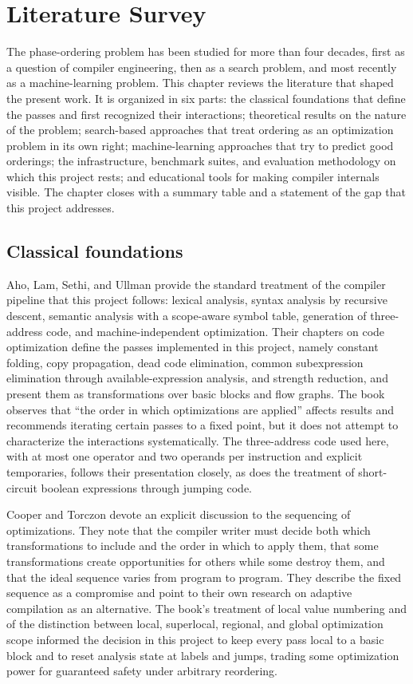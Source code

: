\chapter{Literature Survey}

The phase-ordering problem has been studied for more than four decades, first as a question of compiler engineering, then as a search problem, and most recently as a machine-learning problem. This chapter reviews the literature that shaped the present work. It is organized in six parts: the classical foundations that define the passes and first recognized their interactions; theoretical results on the nature of the problem; search-based approaches that treat ordering as an optimization problem in its own right; machine-learning approaches that try to predict good orderings; the infrastructure, benchmark suites, and evaluation methodology on which this project rests; and educational tools for making compiler internals visible. The chapter closes with a summary table and a statement of the gap that this project addresses.

\section*{Classical foundations}

Aho, Lam, Sethi, and Ullman \cite{aho2006} provide the standard treatment of the compiler pipeline that this project follows: lexical analysis, syntax analysis by recursive descent, semantic analysis with a scope-aware symbol table, generation of three-address code, and machine-independent optimization. Their chapters on code optimization define the passes implemented in this project, namely constant folding, copy propagation, dead code elimination, common subexpression elimination through available-expression analysis, and strength reduction, and present them as transformations over basic blocks and flow graphs. The book observes that ``the order in which optimizations are applied'' affects results and recommends iterating certain passes to a fixed point, but it does not attempt to characterize the interactions systematically. The three-address code used here, with at most one operator and two operands per instruction and explicit temporaries, follows their presentation closely, as does the treatment of short-circuit boolean expressions through jumping code.

Cooper and Torczon \cite{cooper2011} devote an explicit discussion to the sequencing of optimizations. They note that the compiler writer must decide both which transformations to include and the order in which to apply them, that some transformations create opportunities for others while some destroy them, and that the ideal sequence varies from program to program. They describe the fixed sequence as a compromise and point to their own research on adaptive compilation as an alternative. The book's treatment of local value numbering and of the distinction between local, superlocal, regional, and global optimization scope informed the decision in this project to keep every pass local to a basic block and to reset analysis state at labels and jumps, trading some optimization power for guaranteed safety under arbitrary reordering.

